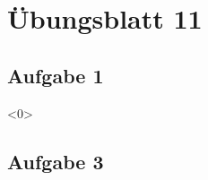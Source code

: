 \documentclass[aspectratio=169,usepdftitle=true,11pt,ngerman,t]{beamer}
\subtitle{Tutorium 12}
\date{17. Januar 2025}
\begin{document}

\section[Ringe und Verbundenheit -- Verlobung?]{Übungsblatt 11}

\subsection{Aufgabe 1}


\begin{frame}<0>
    \begin{solve}
    \end{solve}
\end{frame}

\subsection{Aufgabe 3}

\end{document}
